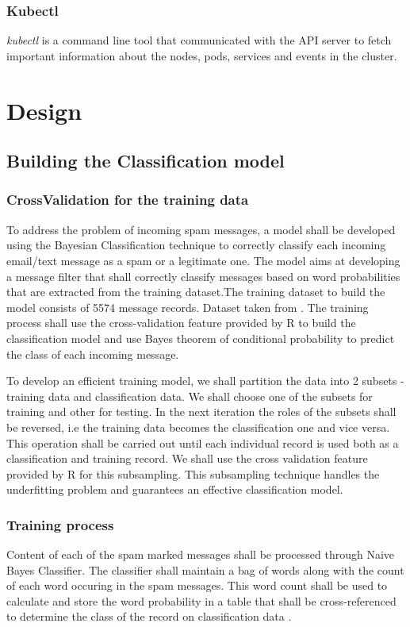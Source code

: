 \documentclass[9pt,twocolumn,twoside]{../../styles/osajnl}
\begin{document}
\subsubsection{Kubectl}
\emph{kubectl} is a command line tool that communicated with the API
server to fetch important information about the nodes, pods, services
and events in the cluster.


\section{Design}
\subsection{Building the Classification model}

\subsubsection{CrossValidation for the training data}

To address the problem of incoming spam messages, a model shall be
developed using the Bayesian Classification technique to correctly
classify each incoming email/text message as a spam or a legitimate
one. The model aims at developing a message filter that shall
correctly classify messages based on word probabilities that are
extracted from the training dataset.The training dataset to build the
model consists of 5574 message records. Dataset taken from
\cite{www-sms-spam-dataset}. The training process shall use the
cross-validation feature provided by R to build the classification
model and use Bayes theorem of conditional probability to predict the
class of each incoming message.

To develop an efficient training model, we shall partition the data
into 2 subsets - training data and classification data. We shall
choose one of the subsets for training and other for testing. In the
next iteration the roles of the subsets shall be reversed, i.e the
training data becomes the classification one and vice versa. This
operation shall be carried out until each individual record is used
both as a classification and training record. We shall use the cross
validation feature provided by R for this subsampling. This
subsampling technique handles the underfitting problem and guarantees
an effective classification model.


\subsubsection{Training process}
Content of each of the spam marked messages shall be processed through
Naive Bayes Classifier.  The classifier shall maintain a bag of words
along with the count of each word occuring in the spam messages. This
word count shall be used to calculate and store the word probability
in a table that shall be cross-referenced to determine the class of
the record on classification
data \cite{paper-classification-of-email}.
\end{document}
